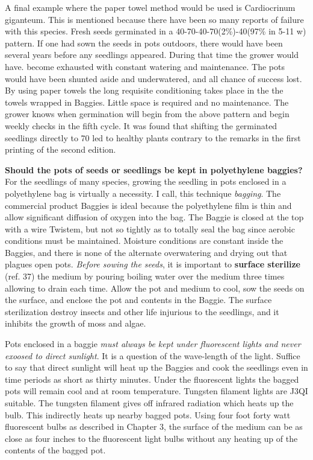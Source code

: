 A final example where the paper towel method would be used is Car\-dio\-cri\-num
giganteum. This is mentioned because there have been so many reports of failure
with this species. Fresh seeds germinated in a 40-70-40-70(2\%)-40(97\% in 5-11 w)
pattern. If one had sown the seeds in pots outdoors, there would have been several
years before any seedlings appeared. During that time the grower would have.
become exhausted with constant watering and maintenance. The pots would have
been shunted aside and underwatered, and all chance of success lost. By using
paper towels the long requisite conditioning takes place in the the towels wrapped in
Baggies. Little space is required and no maintenance. The grower knows when
germination will begin from the above pattern and begin weekly checks in the fifth
cycle. It was found that shifting the germinated seedlings directly to 70 led to healthy
plants contrary to the remarks in the first printing of the second edition.

\textbf{Should the pots of seeds or seedlings be kept in polyethylene
baggies?} For the seedlings of many species, growing the seedling in pots enclosed
in a polyethylene bag is virtually a necessity. I call, this technique \textit{bagging}. The
commercial product Baggies is ideal because the polyethylene film is thin and allow
significant diffusion of oxygen into the bag. The Baggie is closed at the top with a wire
Twistem, but not so tightly as to totally seal the bag since aerobic conditions must be
maintained. Moisture conditions are constant inside the Baggies, and there is none of
the alternate overwatering and drying out that plagues open pots. \textit{Before sowing the seeds},
it is important to \textbf{surface sterilize} (ref. 37) the medium by pouring boiling
water over the medium three times allowing to drain each time. Allow the pot and
medium to cool, sow the seeds on the surface, and enclose the pot and contents in the
Baggie. The surface sterilization destroy insects and other life injurious to the
seedlings, and it inhibits the growth of moss and algae.

Pots enclosed in a baggie \textit{must always be kept under fluorescent lights and
never exoosed to direct sunlight}. It is a question of the wave-length of the light.
Suffice to say that direct sunlight will heat up the Baggies and cook the seedlings even
in time periods as short as thirty minutes. Under the fluorescent lights the bagged pots
will remain cool and at room temperature. Tungsten filament lights are J3QI suitable.
The tungsten filament gives off infrared radiation which heats up the bulb. This
indirectly heats up nearby bagged pots. Using four foot forty watt fluorescent bulbs as
described in Chapter 3, the surface of the medium can be as close as four inches to
the fluorescent light bulbs without any heating up of the contents of the bagged pot.

